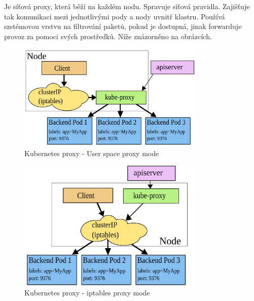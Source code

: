 Je síťová proxy, která běží na každém nodu. Spravuje síťová pravidla. Zajišťuje tak komunikaci mezi jednotlivými pody a nody uvnitř klastru. Používá szstémovou vrstvu na filtrování paketů, pokud je dostupná, jinak forwarduje provoz za pomoci svých prostředků. Níže znázorněno na obrázcích.
\begin{figure}[!h]
	\centering
 	\includegraphics[width=0.8\textwidth, angle=0]{kubernetes-proxy.png}
 	\caption[Kubernetes proxyuspm]{Kubernetes proxy - User space proxy mode}\label{fig:float}
\end{figure}

\begin{figure}[!h]
	\centering
 	\includegraphics[width=0.8\textwidth, angle=0]{kubernetes-proxyip.png}
 	\caption[Kubernetes proxyiptpm]{Kubernetes proxy - iptables proxy mode}\label{fig:float}
\end{figure}



